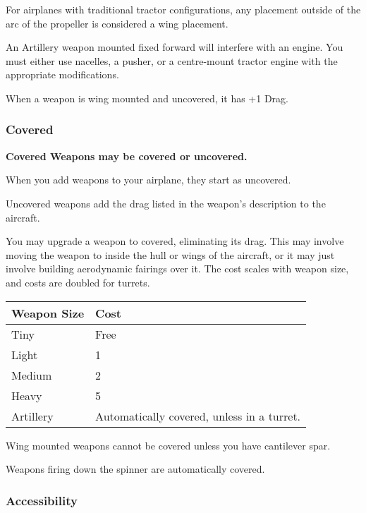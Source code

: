\documentclass{article}
\begin{document}
For airplanes with traditional tractor configurations, any placement
outside of the arc of the propeller is considered a wing placement.

An Artillery weapon mounted fixed forward will interfere with an engine.
You must either use nacelles, a pusher, or a centre-mount tractor engine
with the appropriate modifications.

When a weapon is wing mounted and uncovered, it has +1 Drag.

\subsubsection{Covered}
\label{_Covered}

\textbf{Covered Weapons may be covered or uncovered.}

When you add weapons to your airplane, they start as uncovered.

Uncovered weapons add the drag listed in the weapon's description to the
aircraft.

You may upgrade a weapon to covered, eliminating its drag. This may
involve moving the weapon to inside the hull or wings of the aircraft,
or it may just involve building aerodynamic fairings over it. The cost
scales with weapon size, and costs are doubled for turrets.

\begin{tabular}{|l|l|}
  \hline
  Weapon Size & Cost                                       \\\hline
  Tiny        & Free                                       \\\hline
  Light       & 1                                          \\\hline
  Medium      & 2                                          \\\hline
  Heavy       & 5                                          \\\hline
  Artillery   & Automatically covered, unless in a turret. \\\hline
\end{tabular}

Wing mounted weapons cannot be covered unless you have cantilever
spar.

Weapons firing down the spinner are automatically covered.

\subsubsection{Accessibility}
\label{_Accessibility}
\end{document}
